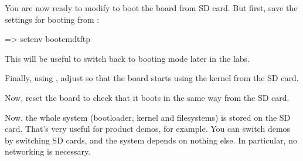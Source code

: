 You are now ready to modify  to boot the board
from SD card. But first, save the settings for booting from
:

\begin{ubootinput}
=> setenv bootcmdtftp %
\end{ubootinput}

This will be useful to switch back to  booting mode
later in the labs.

Finally, using , adjust  so that
the board starts using the kernel from the SD card.

Now, reset the board to check that it boots in the same way from the
SD card.

Now, the whole system (bootloader, kernel and filesystems) is
stored on the SD card. That's very useful for product demos, for
example. You can switch demos by switching SD cards, and the
system depends on nothing else. In particular, no networking is
necessary.
